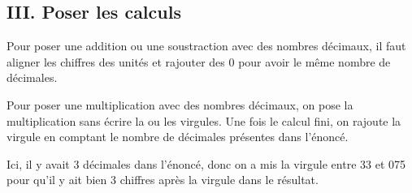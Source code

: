 \subsection*{III. Poser les calculs}

\begin{Méthode}[c]
Pour poser une addition ou une soustraction avec des nombres décimaux, il faut aligner les chiffres des unités et rajouter des 0 pour avoir le même nombre de décimales. \\
\begin{center}
\hspace{2cm}
\end{center}

\end{Méthode}

\begin{Exemples}
\begin{center}
\hspace{2cm}
\end{center}
\end{Exemples}

\begin{Méthode}[c]
Pour poser une multiplication avec des nombres décimaux, on pose la multiplication sans écrire la ou les virgules. Une fois le calcul fini, on rajoute la virgule en comptant le nombre de décimales présentes dans l'énoncé. \\
\begin{center}
\end{center}
Ici, il  y avait 3 décimales dans l'énoncé, donc on a mis la virgule entre 33 et 075 pour qu'il  y ait bien 3 chiffres après la virgule dans le résultat.
\end{Méthode}

\begin{Exemple}
\begin{center}
\end{center}
\end{Exemple}


\newpage